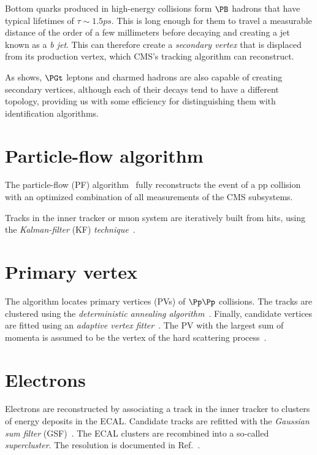 Bottom quarks produced in high-energy collisions form $\PB$ hadrons that have typical lifetimes of $\tau\sim1.5\unit{ps}$. This is long enough for them to travel a measurable distance of the order of a few millimeters before decaying and creating a jet known as a \emph{b jet}. This can therefore create a \emph{secondary vertex} that is displaced from its production vertex, which CMS's tracking algorithm can reconstruct.

As  shows, $\PGt$ leptons and charmed hadrons are also capable of creating secondary vertices, although each of their decays tend to have a different topology, providing us with some efficiency for distinguishing them with identification algorithms.


\section{Particle-flow algorithm} \label{sec:PF}
The particle-flow (PF) algorithm~\cite{PF1,PF2017} fully reconstructs the event of a pp collision with an optimized combination of all measurements of the CMS subsystems.

Tracks in the inner tracker or muon system are iteratively built from hits, using the \emph{Kalman-filter} (KF) \emph{technique}~\cite{CMS_track_reco_2006,Kalman_filtering}.


\section{Primary vertex} \label{sec:PV}
The algorithm locates primary vertices (PVs) of $\Pp\Pp$ collisions.
The tracks are clustered using the \emph{deterministic annealing algorithm}~\cite{deterministic_annealing}.
Finally, candidate vertices are fitted using an \emph{adaptive vertex fitter}~\cite{vertex_fitting}.
The PV with the largest sum of momenta is assumed to be the vertex of the hard scattering process~\cite{CMS_vertex,PF2017,CMS_vertex_phase2}.


\section{Electrons} \label{sec:electron}

Electrons are reconstructed by associating a track in the inner tracker to clusters of energy deposits in the ECAL.
Candidate tracks are refitted with the \emph{Gaussian sum filter} (GSF)~\cite{GSF}.
The ECAL clusters are recombined into a so-called \emph{supercluster}.
The resolution is documented in Ref.~\cite{CMS_electron_2021,CMS_electron_calibration_2016}.

